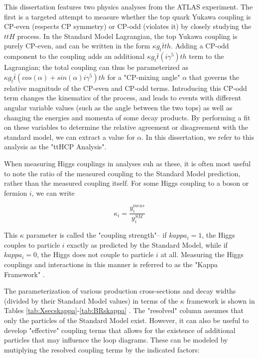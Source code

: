 This dissertation features two physics analyses from the ATLAS experiment. The first is a targeted attempt to measure whether the top quark Yukawa coupling is CP-even (respects CP symmetry) or CP-odd (violates it) by closely studying the $ttH$ process. In the Standard Model Lagrangian, the top Yukawa coupling is purely CP-even, and can be written in the form $\kappa g_{t} \bar{t}th$. Adding a CP-odd component to the coupling adds an additional $\kappa g_{t} \bar{t} (i \gamma^{5})th$ term to the Lagrangian; the total coupling can thus be parameterized as $\kappa g_{t} \bar{t} (cos(\alpha)+ sin(\alpha) i \gamma^{5} )th$ for a "CP-mixing angle" $\alpha$ that governs the relative magnitude of the CP-even and CP-odd terms. Introducing this CP-odd term changes the kinematics of the process, and leads to events with different angular variable values (such as the angle between the two tops) as well as changing the energies and momenta of some decay products. By performing a fit on these variables to determine the relative agreement or disagreement with the standard model, we can extract a value for $\alpha$. In this dissertation, we refer to this analysis as the "ttHCP Analysis".

When measuring Higgs couplings in analyses suh as these, it is often most useful to note the ratio of the measured coupling to the Standard Model prediction, rather than the measured coupling itself. For some Higgs coupling to a boson or fermion $i$, we can write

\begin{equation}
\kappa_{i} = \frac{y_{i}^{meas}}{y_{i}^{SM}}
\end{equation}

This $\kappa$ parameter is called the "coupling strength"-- if $kappa_{i} = 1$, the Higgs couples to particle $i$ exactly as predicted by the Standard Model, while if $kappa_{i} = 0$, the Higgs does not couple to particle $i$ at all. Measuring the Higgs couplings and interactions in this manner is referred to as the "Kappa Framework" \cite{LHCHiggsCrossSectionWorkingGroup}.

The parameterization of various production cross-sections and decay widths (divided by their Standard Model values) in terms of the $\kappa$ framework is shown in Tables \ref{tab:Xsecskappa}-\ref{tab:BRskappa} \cite{PhysRevD.101.012002}. The "resolved" column assumes that only the particles of the Standard Model exist. However, it can also be useful to develop "effective" coupling terms that allows for the existence of additional particles that may influence the loop diagrams. These can be modeled by mutiplying the resolved coupling terms by the indicated factors:

